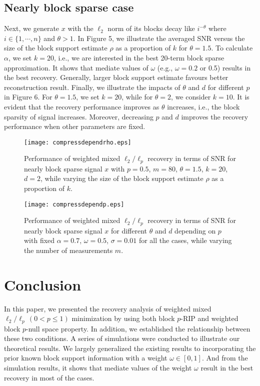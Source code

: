 \documentclass[11pt]{article}
\begin{document}
\subsection{Nearly block sparse case}

Next, we generate $x$ with the $\ell_2$ norm of its blocks decay like $i^{-\theta}$ where $i\in\{1,\cdots,n\}$ and $\theta>1$. In Figure 5,  we illustrate the averaged SNR versus the size of the block support estimate $\rho$ as a proportion of $k$ for $\theta=1.5$. To calculate $\alpha$, we set $k=20$, i.e., we are interested in the best 20-term block sparse approximation. It shows that mediate values of $\omega$ (e.g., $\omega=0.2$ or 0.5) results in the best recovery. Generally, larger block support estimate favours better reconstruction result. Finally, we illustrate the impacts of $\theta$ and $d$ for different $p$ in Figure 6. For $\theta=1.5$, we set $k=20$, while for $\theta=2$, we consider $k=10$. It is evident that the recovery performance improves as $\theta$ increases, i.e., the block sparsity of signal increases. Moreover, decreasing $p$ and $d$ improves the recovery performance when other parameters are fixed.
\begin{figure}[htp]
	\centering
	\texttt{[image: compressdependrho.eps]}
	\caption{Performance of weighted mixed $\ell_2/\ell_p$ recovery in terms of SNR for nearly block sparse signal $x$ with $p=0.5$, $m=80$, $\theta=1.5$, $k=20$, $d=2$, while varying the size of the block support estimate $\rho$ as a proportion of $k$.}\label{fig:5}
\end{figure}

\begin{figure}[htp]
	\centering
	\texttt{[image: compressdependp.eps]}
	\caption{Performance of weighted mixed $\ell_2/\ell_p$ recovery in terms of SNR for nearly block sparse signal $x$ for different $\theta$ and $d$ depending on $p$ with fixed $\alpha=0.7$, $\omega=0.5$, $\sigma=0.01$ for all the cases, while varying the number of measurements $m$.}\label{fig:6}
\end{figure}


\section{Conclusion}
In this paper, we presented the recovery analysis of weighted mixed $\ell_2/\ell_p\,(0<p\leq 1)$ minimization by using both block $p$-RIP and weighted block $p$-null space property. In addition, we established the relationship between these two conditions. A series of simulations were conducted to illustrate our theoretical results. We largely generalized the existing results \cite{fmsy,hwwx,vl,wwx1,wwx2} to incorporating the prior known block support information with a weight $\omega\in[0,1]$. And from the simulation results, it shows that mediate values of the weight $\omega$ result in the best recovery in most of the cases. 
\end{document}
